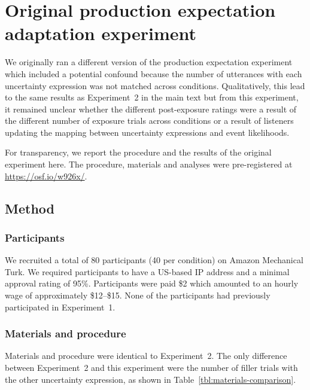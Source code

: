 \documentclass[man, floatsintext]{apa6}
\begin{document}
\section{Original production expectation adaptation experiment}
\setcounter{section}{5}
\setcounter{subsection}{0}


We originally ran a different version of the production expectation experiment which included a potential confound because the number of utterances
with each uncertainty expression was not matched across conditions. Qualitatively, this lead to the same results as Experiment~2 in the main text 
but from this experiment, it remained unclear whether the different post-exposure ratings were a result of the different number of exposure trials
across conditions or a result of listeners updating the mapping between uncertainty expressions and event likelihoods.  

For transparency, we report the procedure and the results of the original experiment here. The procedure, materials and analyses were pre-registered at \url{https://osf.io/w926x/}.

\subsection{Method}
\subsubsection{Participants}
We recruited a total of 80 participants (40 per condition) on Amazon Mechanical Turk. 
We required participants to have a US-based IP address and a minimal approval rating 
of 95\%. Participants were paid \$2 which amounted to an hourly wage of approximately 
\$12--\$15. None of the participants had previously participated in Experiment~1.

\subsubsection{Materials and procedure}

Materials and procedure were identical to Experiment~2. The only difference between Experiment~2 and this experiment were the number of filler trials with the other uncertainty expression, as shown in Table~\ref{tbl:materials-comparison}.
\end{document}
